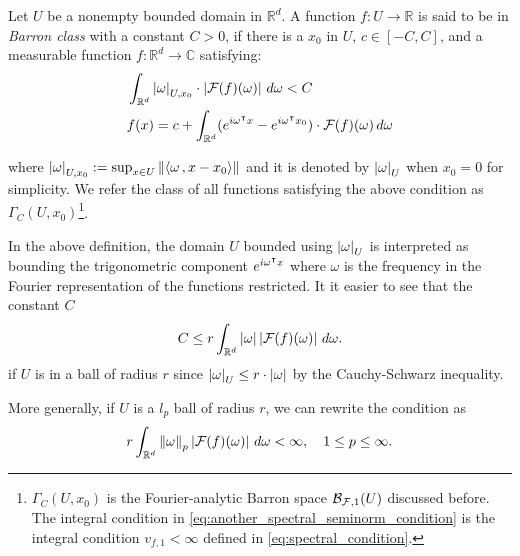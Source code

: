 \begin{definition}
    \label{def:barron_class}
    Let $U$ be a nonempty bounded domain in $\mathbb{R}^d$. A function $f: U \to
    \mathbb{R}$ is said to be in \textit{Barron class} with a constant $C > 0$,
    if there is a $x_0$ in $U$, $c \in [-C, C]$, and a measurable function $f:
    \mathbb{R}^d \to \mathbb{C}$ satisfying:
    \begin{align}
        & \int_{\mathbb{R}^d} \left| \omega \right|_{U, x_0} 
        \cdot \left| \mathcal{F}(f)(\omega) \right| \,d\omega < C 
        \label{eq:another_spectral_seminorm_condition} \\
        & f(x) = c + \int_{\mathbb{R}^d} (
            e^{i\omega{}^{\intercal} x} - e^{i\omega{}^{\intercal} x_0}
        ) \cdot \mathcal{F}(f)(\omega)\,d\omega
    \end{align}

    where $\left| \omega \right|_{U, x_0} := \sup_{x\in U}\left\| \left\langle \omega\, , x - x_0 \right\rangle \right\|$
    and it is denoted by $\left| \omega \right|_U$ when $x_0 = 0$ for simplicity. We
    refer the class of all functions satisfying the above condition as 
    $\Gamma_C(U, x_0)$\footnote{
        $\Gamma_C(U, x_0)$ is the Fourier-analytic Barron space
        $\mathcal{B}_{\mathcal{F}, 1}(U)$ discussed before. The integral condition in
        \eqref{eq:another_spectral_seminorm_condition} is the integral condition
        $v_{f,1} < \infty$ defined in \eqref{eq:spectral_condition}.
    }.
\end{definition}

\begin{remark}
    In the above definition, the domain $U$ bounded using $\left| \omega \right|_{U}$ is
    interpreted as bounding the trigonometric component $e^{i\omega{}^{\intercal} x}$ where
    $\omega$ is the frequency in the Fourier representation of the functions
    restricted. It it easier to see that the constant $C$
    \begin{equation}
        C \leq r \int_{\mathbb{R}^d} \left| \omega \right| \left| \mathcal{F}(f)(\omega) \right|\,d\omega.
    \end{equation}
    if $U$ is in a ball of radius $r$ since $\left| \omega \right|_{U} \leq r \cdot
    \left| \omega \right|$ by the Cauchy-Schwarz inequality.

    More generally, if $U$ is a $l_p$ ball of radius $r$, we can rewrite the
    condition as
    \begin{equation}
        r \int_{\mathbb{R}^d} \left\| \omega \right\|_p \left| \mathcal{F}(f)(\omega) \right|\,d\omega 
        < \infty, \quad 1 \leq p \leq \infty.
    \end{equation}

\end{remark}



